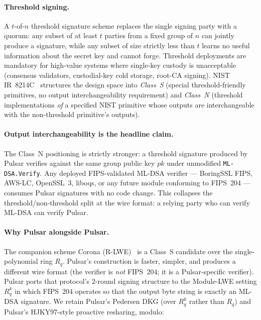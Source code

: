 \documentclass[11pt,a4paper]{article}
\theoremstyle{definition}
\theoremstyle{remark}
\newcommand{\Rq}{R_q}
\begin{document}
\paragraph{Threshold signing.}
A $t$-of-$n$ threshold signature scheme replaces the single signing
party with a quorum: any subset of at least $t$ parties from a fixed
group of $n$ can jointly produce a signature, while any subset of
size strictly less than $t$ learns no useful information about the
secret key and cannot forge. Threshold deployments are mandatory for
high-value systems where single-key custody is unacceptable
(consensus validators, custodial-key cold storage, root-CA signing).
NIST IR~8214C~\cite{nist-ir-8214c} structures the design space into
\emph{Class~S} (special threshold-friendly primitives, no output
interchangeability requirement) and \emph{Class~N} (threshold
implementations \emph{of} a specified NIST primitive whose outputs
are interchangeable with the non-threshold primitive's outputs).

\paragraph{Output interchangeability is the headline claim.}
The Class~N positioning is strictly stronger: a threshold signature
produced by Pulsar verifies against the same group public key
$\mathit{pk}$ under unmodified \texttt{ML-DSA.Verify}. Any deployed
FIPS-validated ML-DSA verifier --- BoringSSL FIPS, AWS-LC, OpenSSL~3,
liboqs, or any future module conforming to FIPS~204 --- consumes
Pulsar signatures with no code change. This collapses the
threshold/non-threshold split at the wire format: a relying party
who can verify ML-DSA can verify Pulsar.

\paragraph{Why Pulsar alongside Pulsar.}
The companion scheme Corona (R-LWE)~\cite{boschini2024ringtail} is a
Class~S candidate over the single-polynomial ring $\Rq$. Pulsar's
construction is faster, simpler, and produces a different wire
format (the verifier is \emph{not} FIPS~204; it is a Pulsar-specific
verifier). Pulsar ports that protocol's $2$-round signing structure
to the Module-LWE setting $\Rq^k$ in which FIPS~204 operates so that
the output byte string is exactly an ML-DSA signature. We retain
Pulsar's Pedersen DKG (over $\Rq^k$ rather than $\Rq$) and Pulsar's
HJKY97-style proactive resharing, modulo:
\end{document}
